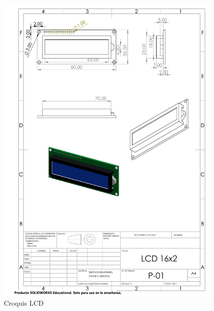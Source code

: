     \begin{figure}[H]
        \centering
        \includegraphics[trim = {10mm 10mm 10mm 10mm},clip,scale=0.2]{23/img/LCD2.pdf}
        \caption{Croquis LCD}
        \label{fig:lcd-16x2}
    \end{figure}
